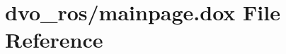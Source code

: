 \hypertarget{dvo__ros_2mainpage_8dox}{}\section{dvo\+\_\+ros/mainpage.dox File Reference}
\label{dvo__ros_2mainpage_8dox}
